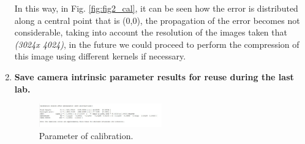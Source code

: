 \documentclass[12pt, twoside]{report}
\begin{document}
\begin{enumerate}
    In this way, in Fig. \ref{fig:fig2_cal}, it can be seen how the error is distributed along a central point that is (0,0), the propagation of the error becomes not considerable, taking into account the resolution of the images taken that \textit{(3024x 4024)}, in the future we could proceed to perform the compression of this image using different kernels if necessary.
    \item \textbf{Save camera intrinsic parameter results for reuse during the last lab.}
    

\begin{figure}[H]
    \centering
    \includegraphics[width=0.5\textwidth]{images/parameters_Calib.jpg}
    \caption{Parameter of calibration.}
    \label{fig:fig3_cal}
\end{figure}




\end{enumerate}
\end{document}
